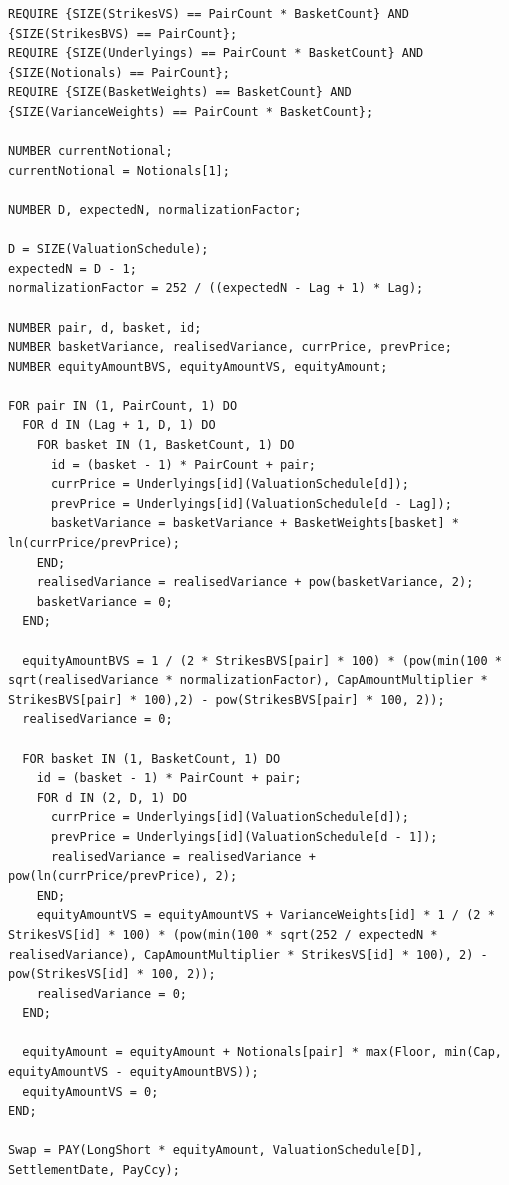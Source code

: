 \begin{listing}[hbt]
\begin{verbatim}
REQUIRE {SIZE(StrikesVS) == PairCount * BasketCount} AND {SIZE(StrikesBVS) == PairCount};
REQUIRE {SIZE(Underlyings) == PairCount * BasketCount} AND {SIZE(Notionals) == PairCount};
REQUIRE {SIZE(BasketWeights) == BasketCount} AND {SIZE(VarianceWeights) == PairCount * BasketCount};

NUMBER currentNotional;
currentNotional = Notionals[1];

NUMBER D, expectedN, normalizationFactor;

D = SIZE(ValuationSchedule);
expectedN = D - 1;
normalizationFactor = 252 / ((expectedN - Lag + 1) * Lag);

NUMBER pair, d, basket, id;
NUMBER basketVariance, realisedVariance, currPrice, prevPrice;
NUMBER equityAmountBVS, equityAmountVS, equityAmount;

FOR pair IN (1, PairCount, 1) DO
  FOR d IN (Lag + 1, D, 1) DO
	FOR basket IN (1, BasketCount, 1) DO
	  id = (basket - 1) * PairCount + pair;
	  currPrice = Underlyings[id](ValuationSchedule[d]);
	  prevPrice = Underlyings[id](ValuationSchedule[d - Lag]);
	  basketVariance = basketVariance + BasketWeights[basket] * ln(currPrice/prevPrice);
	END;
	realisedVariance = realisedVariance + pow(basketVariance, 2);
	basketVariance = 0;
  END;

  equityAmountBVS = 1 / (2 * StrikesBVS[pair] * 100) * (pow(min(100 * sqrt(realisedVariance * normalizationFactor), CapAmountMultiplier * StrikesBVS[pair] * 100),2) - pow(StrikesBVS[pair] * 100, 2));
  realisedVariance = 0;

  FOR basket IN (1, BasketCount, 1) DO
	id = (basket - 1) * PairCount + pair;
	FOR d IN (2, D, 1) DO
	  currPrice = Underlyings[id](ValuationSchedule[d]);
	  prevPrice = Underlyings[id](ValuationSchedule[d - 1]);
	  realisedVariance = realisedVariance + pow(ln(currPrice/prevPrice), 2);
	END;
	equityAmountVS = equityAmountVS + VarianceWeights[id] * 1 / (2 * StrikesVS[id] * 100) * (pow(min(100 * sqrt(252 / expectedN * realisedVariance), CapAmountMultiplier * StrikesVS[id] * 100), 2) - pow(StrikesVS[id] * 100, 2));
	realisedVariance = 0;
  END;

  equityAmount = equityAmount + Notionals[pair] * max(Floor, min(Cap, equityAmountVS - equityAmountBVS));
  equityAmountVS = 0;
END;

Swap = PAY(LongShort * equityAmount, ValuationSchedule[D], SettlementDate, PayCcy);
\end{verbatim}
\caption{Payoff script for a PairwiseGeometricVarianceDispersionSwap.}
\label{lst:pairwise_geometric_variance_dispersion_swap}
\end{listing}

